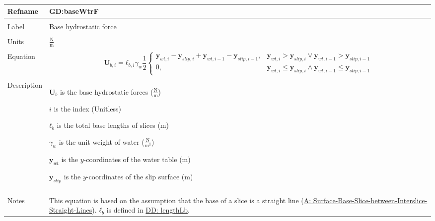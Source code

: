 \documentclass[12pt]{article}
\begin{document}
\vspace{\baselineskip}
\noindent
\begin{minipage}{\textwidth}
\begin{tabular}{>{\raggedright}p{}>{\raggedright\arraybackslash}p{}}
\toprule \textbf{Refname} & \textbf{GD:baseWtrF}
\label{GD:baseWtrF}
\\ \midrule \\
Label & Base hydrostatic force
        
\\ \midrule \\
Units & $\frac{\text{N}}{\text{m}}$
        
\\ \midrule \\
Equation & \begin{displaymath}
           {\mathbf{U}_{b,i}}={\mathbf{ℓ}_{b,i}} {γ_{w}} \frac{1}{2} \begin{cases}
                                                                     {\mathbf{y}_{wt,i}}-{\mathbf{y}_{slip,i}}+{\mathbf{y}_{wt,i-1}}-{\mathbf{y}_{slip,i-1}}, & {\mathbf{y}_{wt,i}}>{\mathbf{y}_{slip,i}}\lor{}{\mathbf{y}_{wt,i-1}}>{\mathbf{y}_{slip,i-1}}\\
0, & {\mathbf{y}_{wt,i}}\leq{}{\mathbf{y}_{slip,i}}\land{}{\mathbf{y}_{wt,i-1}}\leq{}{\mathbf{y}_{slip,i-1}}
                                                                     \end{cases}
           \end{displaymath}
\\ \midrule \\
Description & \begin{symbDescription}
              \item{${\mathbf{U}_{b}}$ is the base hydrostatic forces ($\frac{\text{N}}{\text{m}}$)}
              \item{$i$ is the index (Unitless)}
              \item{${\mathbf{ℓ}_{b}}$ is the total base lengths of slices (m)}
              \item{${γ_{w}}$ is the unit weight of water ($\frac{\text{N}}{\text{m}^{3}}$)}
              \item{${\mathbf{y}_{wt}}$ is the $y$-coordinates of the water table (m)}
              \item{${\mathbf{y}_{slip}}$ is the $y$-coordinates of the slip surface (m)}
              \end{symbDescription}
\\ \midrule \\
Notes & This equation is based on the assumption that the base of a slice is a straight line (\hyperref[assumpSBSBISL]{A: Surface-Base-Slice-between-Interslice-Straight-Lines}). ${\mathbf{ℓ}_{b}}$ is defined in \hyperref[DD:lengthLb]{DD: lengthLb}.
        

\end{tabular}
\end{minipage}
\end{document}

